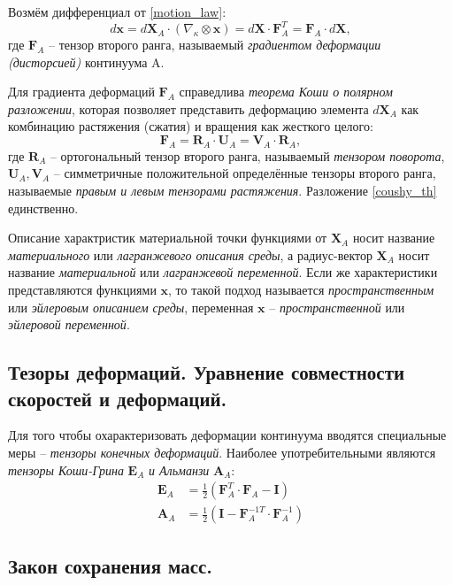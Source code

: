 	Возмём дифференциал от \eqref{motion_law}:
\begin{equation}
	\label{gradient}
	d\mathbf{x} = d\mathbf{X}_A \cdot \left(\nabla_{\kappa} \otimes \mathbf{x} \right) = d\mathbf{X} \cdot \mathbf{F}_A^T = \mathbf{F}_A \cdot d\mathbf{X},
\end{equation}
	где $\mathbf{F}_A$ -- тензор второго ранга, называемый \textit{градиентом деформации (дисторсией)} континуума A.
	
	Для градиента деформаций $\textbf{F}_A$ справедлива \textit{теорема Коши о полярном разложении}, которая позволяет представить деформацию элемента $d\mathbf{X}_A$ как комбинацию растяжения (сжатия) и вращения как жесткого целого:
\begin{equation}
	\label{coushy_th}
	\mathbf{F}_A = \mathbf{R}_A \cdot \mathbf{U}_A = \mathbf{V}_A \cdot \mathbf{R}_A,
\end{equation}
	где $\mathbf{R}_A$ -- ортогональный тензор второго ранга, называемый \textit{тензором поворота},
	$\mathbf{U}_A, \mathbf{V}_A$ -- симметричные положительной определённые тензоры второго ранга, называемые \textit{правым и левым тензорами растяжения}. Разложение \eqref{coushy_th} единственно.
	
	Описание характристик материальной точки функциями от $\mathbf{X}_A$ носит название \textit{материального} или \textit{лагранжевого описания среды}, а радиус-вектор $\textbf{X}_A$ носит название \textit{материальной} или \textit{лагранжевой переменной}. Если же характеристики представляются функциями $\mathbf{x}$, то такой подход называется \textit{пространственным} или \textit{эйлеровым описанием среды}, переменная $\mathbf{x}$ -- \textit{пространственной} или \textit{эйлеровой переменной}.

\subsection{Тезоры деформаций. Уравнение совместности скоростей и деформаций.}
	Для того чтобы охарактеризовать деформации континуума вводятся специальные меры -- \textit{тензоры конечных деформаций}. Наиболее употребительными являются \textit{тензоры Коши-Грина} $\mathbf{E}_A$ \textit{и Альманзи} $\mathbf{A}_A$:
\begin{align}
	\label{strain_measures}
	\mathbf{E}_A &= \frac{1}{2}\left(\mathbf{F}_A^T \cdot \mathbf{F}_A - \mathbf{I}\right)\\
	\mathbf{A}_A &= \frac{1}{2}\left(\mathbf{I} - \mathbf{F}_A^{-1T} \cdot \mathbf{F}_A^{-1}\right)
\end{align}

\subsection{Закон сохранения масс.}